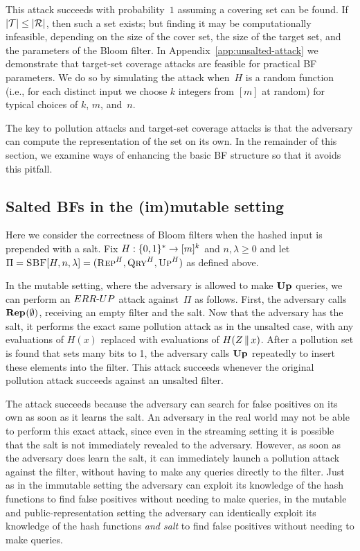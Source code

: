 This  attack succeeds with probability~$1$ assuming a covering set can
be found.  If $|\mathcal{T}| \leq |\mathcal{R}|$, then such a set exists; but finding it may be
computationally infeasible, depending on the size of the cover set, the size of
the target set, and the parameters of the Bloom filter.
%
In Appendix~\ref{app:unsalted-attack} we demonstrate that target-set coverage
attacks are feasible for practical BF parameters. We do so by simulating the
attack when~$H$ is a random function (i.e., for each distinct input we choose
$k$ integers from $[m]$ at random) for typical choices of $k$, $m$, and~$n$.
%


The key to pollution attacks and target-set coverage attacks is that the
adversary can compute the representation of the set on its own. In the remainder
of this section, we examine ways of enhancing the basic BF structure so that it
avoids this pitfall.

\subsection{Salted BFs in the (im)mutable setting}
%
Here we consider the correctness of Bloom filters when the hashed input is
prepended with a salt.
%
Fix $H:\{0,1\}^*\to[m]^k$ and $n,\lambda\geq0$ and let
$\Pi = \textnormal{\textsc{SBF}}[H,n,\lambda] = (\textnormal{\textsc{Rep}}^H, \textnormal{\textsc{Qry}}^H, \textnormal{\textsc{Up}}^H)$ as defined above.

In the mutable setting, where the adversary is allowed to make $\textup{\textbf{Up}}\hspace{0.5pt}$ queries,
we can perform an ${ERR\mbox{-}UP}$ attack against~$\Pi$ as follows. First, the adversary
calls $\textup{\textbf{Rep}}\hspace{0.5pt}(\emptyset)$, receiving an empty filter and the salt. Now that the
adversary has the salt, it performs the exact same pollution attack as in the
unsalted case, with any evaluations of $H(x)$ replaced with evaluations of
$H(Z \, \| \, x)$. After a pollution set is found that sets many bits to 1, the
adversary calls $\textup{\textbf{Up}}\hspace{0.5pt}$ repeatedly to insert these elements into the filter. This
attack succeeds whenever the original pollution attack succeeds against an
unsalted filter.

%

The attack succeeds because the adversary can search for false positives on its
own as soon as it learns the salt. An adversary in the real world may not be
able to perform this exact attack, since even in the streaming setting it is
possible that the salt is not immediately revealed to the adversary. However, as
soon as the adversary does learn the salt, it can immediately launch a pollution
attack against the filter, without having to make any queries directly to the
filter. Just as in the immutable setting the adversary can exploit its knowledge
of the hash functions to find false positives without needing to make queries,
in the mutable and public-representation setting the adversary can identically
exploit its knowledge of the hash functions \textit{and salt} to find false
positives without needing to make queries.

